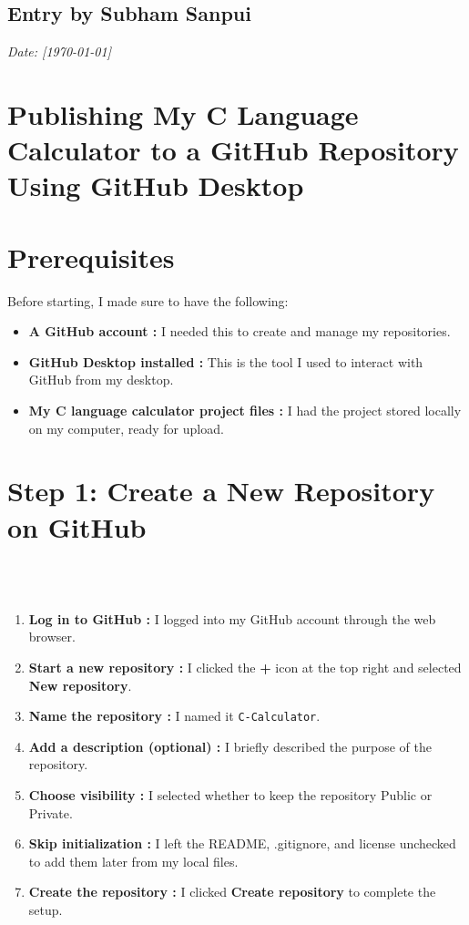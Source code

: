 \documentclass[12pt, a4paper]{article}
\begin{document}
\newpage
{}%
\vspace{-2cm}
\subsection*{Entry by Subham Sanpui}
\textit{Date: [\today]}\\
\section*{Publishing My C Language Calculator to a GitHub Repository Using GitHub Desktop}
\section*{Prerequisites}
Before starting, I made sure to have the following:

\begin{itemize}
\item \textbf{A GitHub account :} I needed this to create and manage my repositories.
\item \textbf{GitHub Desktop installed :} This is the tool I used to interact with GitHub from my desktop.
\item \textbf{My C language calculator project files :} I had the project stored locally on my computer, ready for upload.

\end{itemize}

\section*{Step 1: Create a New Repository on GitHub}
\\\
\begin{enumerate}
    \item \textbf{Log in to GitHub :} I logged into my GitHub account through the web browser.
    \item \textbf{Start a new repository :} I clicked the \textbf{+} icon at the top right and selected \textbf{New repository}.
    \item \textbf{Name the repository :} I named it \texttt{C-Calculator}.
    \item \textbf{Add a description (optional) :} I briefly described the purpose of the repository.
    \item \textbf{Choose visibility :} I selected whether to keep the repository Public or Private.
    \item \textbf{Skip initialization :} I left the README, .gitignore, and license unchecked to add them later from my local files.
    \item \textbf{Create the repository :} I clicked \textbf{Create repository} to complete the setup.

\end{enumerate}
\end{document}
